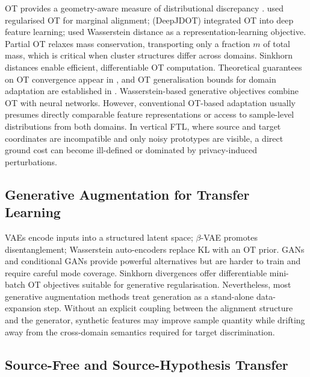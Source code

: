 \documentclass[a4paper,fleqn]{cas-sc}
\begin{document}
OT provides a geometry-aware measure of distributional discrepancy
\citep{Villani2008,Peyre2019,Caffarelli2010}.
\citet{Courty2017} used regularised OT for marginal alignment;
\citet{Damodaran2018} (DeepJDOT) integrated OT into deep feature learning;
\citet{Shen2018AAAI} used Wasserstein distance as a representation-learning
objective.
Partial OT \citep{Chapel2020,Chizat2018} relaxes mass conservation,
transporting only a fraction $m$ of total mass, which is critical when
cluster structures differ across domains.
Sinkhorn distances \citep{Cuturi2013} enable efficient, differentiable OT
computation.
Theoretical guarantees on OT convergence appear in \citep{Fournier2015},
and OT generalisation bounds for domain adaptation are established in
\citep{Redko2017,Zhang2019DA,BenDavid2010}.
Wasserstein-based generative objectives \citep{Frogner2015,Genevay2018,
Tolstikhin2017,Alvarez2021} combine OT with neural networks.
However, conventional OT-based adaptation usually presumes directly
comparable feature representations or access to sample-level distributions
from both domains. In vertical FTL, where source and target coordinates are
incompatible and only noisy prototypes are visible, a direct ground cost can
become ill-defined or dominated by privacy-induced perturbations.

\subsection{Generative Augmentation for Transfer Learning}

VAEs \citep{Kingma2014} encode inputs into a structured latent space;
$\beta$-VAE \citep{Higgins2017} promotes disentanglement; Wasserstein
auto-encoders \citep{Tolstikhin2017} replace KL with an OT prior.
GANs \citep{Goodfellow2014} and conditional GANs \citep{Mirza2014} provide
powerful alternatives but are harder to train and require careful mode
coverage.
Sinkhorn divergences \citep{Cuturi2013,Genevay2018} offer differentiable
mini-batch OT objectives suitable for generative regularisation.
Nevertheless, most generative augmentation methods treat generation as a
stand-alone data-expansion step. Without an explicit coupling between the
alignment structure and the generator, synthetic features may improve sample
quantity while drifting away from the cross-domain semantics required for
target discrimination.

\subsection{Source-Free and Source-Hypothesis Transfer}
\end{document}
